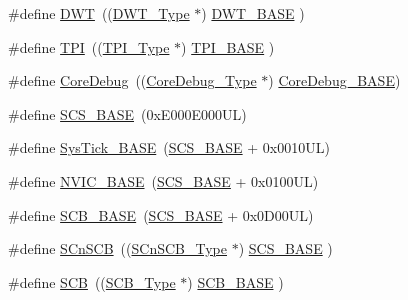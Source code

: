 \begin{DoxyCompactItemize}
\item 
\#define \hyperlink{group___c_m_s_i_s__core__base_gabbe5a060185e1d5afa3f85b14e10a6ce}{D\+WT}~((\hyperlink{struct_d_w_t___type}{D\+W\+T\+\_\+\+Type}       $\ast$)     \hyperlink{group___c_m_s_i_s__core__base_gafdab534f961bf8935eb456cb7700dcd2}{D\+W\+T\+\_\+\+B\+A\+SE}      )
\item 
\#define \hyperlink{group___c_m_s_i_s__core__base_ga8b4dd00016aed25a0ea54e9a9acd1239}{T\+PI}~((\hyperlink{struct_t_p_i___type}{T\+P\+I\+\_\+\+Type}       $\ast$)     \hyperlink{group___c_m_s_i_s__core__base_ga2b1eeff850a7e418844ca847145a1a68}{T\+P\+I\+\_\+\+B\+A\+SE}      )
\item 
\#define \hyperlink{group___c_m_s_i_s__core__base_gab6e30a2b802d9021619dbb0be7f5d63d}{Core\+Debug}~((\hyperlink{struct_core_debug___type}{Core\+Debug\+\_\+\+Type} $\ast$)     \hyperlink{group___c_m_s_i_s__core__base_ga680604dbcda9e9b31a1639fcffe5230b}{Core\+Debug\+\_\+\+B\+A\+SE})
\item 
\#define \hyperlink{group___c_m_s_i_s__core__base_ga3c14ed93192c8d9143322bbf77ebf770}{S\+C\+S\+\_\+\+B\+A\+SE}~(0x\+E000\+E000\+U\+L)
\item 
\#define \hyperlink{group___c_m_s_i_s__core__base_ga58effaac0b93006b756d33209e814646}{Sys\+Tick\+\_\+\+B\+A\+SE}~(\hyperlink{group___c_m_s_i_s__core__base_ga3c14ed93192c8d9143322bbf77ebf770}{S\+C\+S\+\_\+\+B\+A\+SE} +  0x0010\+U\+L)
\item 
\#define \hyperlink{group___c_m_s_i_s__core__base_gaa0288691785a5f868238e0468b39523d}{N\+V\+I\+C\+\_\+\+B\+A\+SE}~(\hyperlink{group___c_m_s_i_s__core__base_ga3c14ed93192c8d9143322bbf77ebf770}{S\+C\+S\+\_\+\+B\+A\+SE} +  0x0100\+U\+L)
\item 
\#define \hyperlink{group___c_m_s_i_s__core__base_gad55a7ddb8d4b2398b0c1cfec76c0d9fd}{S\+C\+B\+\_\+\+B\+A\+SE}~(\hyperlink{group___c_m_s_i_s__core__base_ga3c14ed93192c8d9143322bbf77ebf770}{S\+C\+S\+\_\+\+B\+A\+SE} +  0x0\+D00\+U\+L)
\item 
\#define \hyperlink{group___c_m_s_i_s__core__base_ga9fe0cd2eef83a8adad94490d9ecca63f}{S\+Cn\+S\+CB}~((\hyperlink{struct_s_cn_s_c_b___type}{S\+Cn\+S\+C\+B\+\_\+\+Type}    $\ast$)     \hyperlink{group___c_m_s_i_s__core__base_ga3c14ed93192c8d9143322bbf77ebf770}{S\+C\+S\+\_\+\+B\+A\+SE}      )
\item 
\#define \hyperlink{group___c_m_s_i_s__core__base_gaaaf6477c2bde2f00f99e3c2fd1060b01}{S\+CB}~((\hyperlink{struct_s_c_b___type}{S\+C\+B\+\_\+\+Type}       $\ast$)     \hyperlink{group___c_m_s_i_s__core__base_gad55a7ddb8d4b2398b0c1cfec76c0d9fd}{S\+C\+B\+\_\+\+B\+A\+SE}      )

\end{DoxyCompactItemize}
